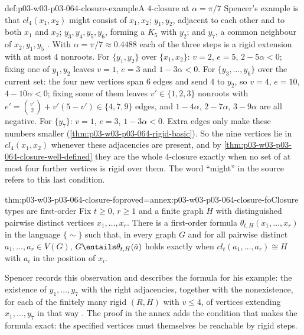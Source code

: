 \begin{hbexample}{def:p03-w03-p03-064-closure-example}{A \(4\)-closure at \(\alpha=\pi/7\)}
Spencer's example is that \(cl_4(x_1,x_2)\) might consist of \(x_1,x_2\);
\(y_1,y_2\), adjacent to each other and to both \(x_1\) and \(x_2\);
\(y_3,y_4,y_5,y_6\), forming a \(K_5\) with \(y_2\); and \(y_7\), a common
neighbour of \(x_2,y_1,y_5\) \cite[p.~8]{Spencer2007LogicRandomStructuresAuthor}.
With \(\alpha=\pi/7\approx0.4488\) each of the three steps is a rigid
extension with at most \(4\) nonroots.  For \(\{y_1,y_2\}\) over
\(\{x_1,x_2\}\): \(v=2\), \(e=5\), \(2-5\alpha<0\); fixing one of \(y_1,y_2\)
leaves \(v=1\), \(e=3\) and \(1-3\alpha<0\).  For \(\{y_3,\ldots,y_6\}\) over
the current set: the four new vertices span \(6\) edges and send \(4\) to
\(y_2\), so \(v=4\), \(e=10\), \(4-10\alpha<0\); fixing some of them leaves
\(v'\in\{1,2,3\}\) nonroots with \(e'=\binom{v'}2+v'(5-v')\in\{4,7,9\}\) edges,
and \(1-4\alpha\), \(2-7\alpha\), \(3-9\alpha\) are all negative.  For
\(\{y_7\}\): \(v=1\), \(e=3\), \(1-3\alpha<0\).  Extra edges only make these
numbers smaller (\cref{thm:p03-w03-p03-064-rigid-basic}).  So the nine
vertices lie in \(cl_4(x_1,x_2)\) whenever these adjacencies are present, and
by \cref{thm:p03-w03-p03-064-closure-well-defined} they are the whole
\(4\)-closure exactly when no set of at most four further vertices is rigid
over them.  The word ``might'' in the source refers to this last condition.
\end{hbexample}

\begin{hblemma}{thm:p03-w03-p03-064-closure-fo}{proved=annex:p03-w03-p03-064-closure-fo}{Closure types are first-order}
Fix \(t\geq0\), \(r\geq1\) and a finite graph \(H\) with distinguished
pairwise distinct vertices \(x_1,\ldots,x_r\).  There is a first-order
formula \(\theta_{t,H}(x_1,\ldots,x_r)\) in the language \(\{\sim\}\) such
that, in every graph \(G\) and for all pairwise distinct
\(a_1,\ldots,a_r\in V(G)\), \(G\entails\theta_{t,H}(\bar a)\) holds exactly
when \(cl_t(a_1,\ldots,a_r)\cong H\) with \(a_i\) in the position of
\(x_i\).
\end{hblemma}

Spencer records this observation and describes the formula for his example:
the existence of \(y_1,\ldots,y_7\) with the right adjacencies, together with
the nonexistence, for each of the finitely many rigid \((R,H)\) with
\(v\leq4\), of vertices extending \(x_1,\ldots,y_7\) in that way
\cite[p.~9]{Spencer2007LogicRandomStructuresAuthor}.  The proof in the annex
adds the condition that makes the formula exact: the specified vertices must
themselves be reachable by rigid steps.

